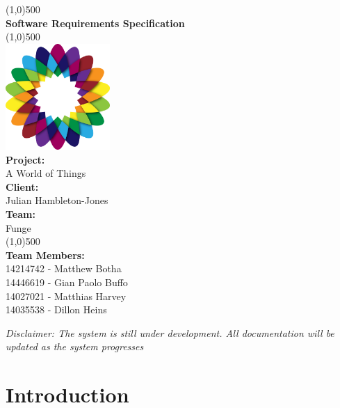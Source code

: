 \documentclass{article}
\let\cleardoublepage\clearpage
\begin{document}
	
	\begin{titlepage}
		\begin{center}
			\line(1,0){500}\\
			[6mm]
			\huge{\bfseries Software Requirements Specification}\\
			\line(1,0){500}\\
			[5mm]
			\includegraphics[width=150px]{../images/AWorldOfPlants.png}
			\\
			[5mm]
			\large\textbf{Project:}\\A World of Things\\
			[3mm]
			\large\textbf{Client:}\\Julian Hambleton-Jones\\
			[3mm]
			\large \textbf{Team:}\\Funge\\
			\line(1,0){500}\\
			[5mm]
			\large \textbf{Team Members:}\\
			[3mm]
			\large 14214742 - Matthew Botha\\
			\large 14446619 - Gian Paolo Buffo\\
			\large 14027021 - Matthias Harvey\\
			\large 14035538 - Dillon Heins\\[3mm]
		\end{center}
	\end{titlepage}
	
	\cleardoublepage
	\thispagestyle{empty}
	\tableofcontents
	
	
	\cleardoublepage
	\setcounter{page}{1}
	
	\textit{Disclaimer: The system is still under development. All documentation will be updated as the system progresses}

\section{Introduction}
\end{document}
